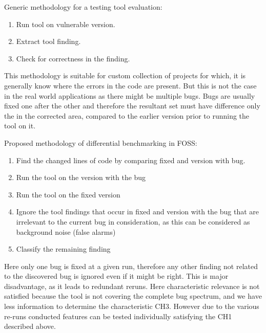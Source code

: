 \documentclass[authoryear,preprint]{sigplanconf}
\begin{document}
Generic methodology for a testing tool evaluation: 
\begin{enumerate}
	\item Run tool on vulnerable version.
	\item Extract tool finding.
	\item Check for correctness in the finding.
\end{enumerate}

This methodology is suitable for custom collection of projects for which, it is generally know where the errors in the code are present. But this is not the case in the real world applications as there might be multiple bugs. Bugs are usually fixed one after the other and therefore the resultant set must have difference only the in the corrected area, compared to the earlier version prior to running the tool on it. 

Proposed methodology of differential benchmarking in FOSS:
\begin{enumerate}
	\item Find the changed lines of code by comparing fixed and version with bug.
	\item Run the tool on the version with the bug
	\item Run the tool on the fixed version
	\item Ignore the tool findings that occur in fixed and version with the bug that are irrelevant to the current bug in consideration, as this can be considered as background noise (false alarms)
	\item Classify the remaining finding
\end{enumerate}

Here only one bug is fixed at a given run, therefore any other finding not related to the discovered bug is ignored even if it might be right. This is major disadvantage, as it leads to redundant reruns. Here characteristic relevance is not satisfied because the tool is not covering the complete bug spectrum, and we have less information to determine the characteristic CH3. However due to the various re-runs conducted features can be tested individually satisfying the CH1 described above.
\end{document}

